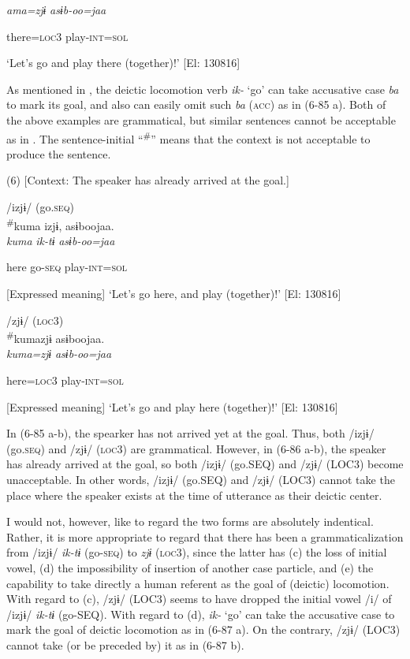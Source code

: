       \textit{ama=zjɨ}  \textit{asɨb-oo=jaa}

      there=\textsc{loc}3  play-\textsc{int}=\textsc{sol}

\glt ‘Let’s go and play there (together)!’ [El: 130816]

As mentioned in , the deictic locomotion verb \textit{ik-} ‘go’ can take accusative case \textit{ba} to mark its goal, and also can easily omit such \textit{ba} (\textsc{acc}) as in (6-85 a). Both of the above examples are grammatical, but similar sentences cannot be acceptable as in . The sentence-initial “\textsuperscript{\#}” means that the context is not acceptable to produce the sentence.

(6)  [Context: The speaker has already arrived at the goal.]

 \ea /izjɨ/ (go.\textsc{seq})\\
{\TM}
\gll  \textsuperscript{\#}kuma  izjɨ,  asɨboojaa.\\

      \textit{kuma}  \textit{ik-tɨ}  \textit{asɨb-oo=jaa}

      here  go-\textsc{seq}  play-\textsc{int}=\textsc{sol}

      [Expressed meaning] ‘Let’s go here, and play (together)!’ [El: 130816]

 \ex /zjɨ/ (\textsc{loc}3)\\
{\TM}
\gll  \textsuperscript{\#}kumazjɨ  asɨboojaa.\\

      \textit{kuma=zjɨ}  \textit{asɨb-oo=jaa}

      here=\textsc{loc}3  play-\textsc{int}=\textsc{sol}

      [Expressed meaning] ‘Let’s go and play here (together)!’ [El: 130816]

In (6-85 a-b), the spearker has not arrived yet at the goal. Thus, both /izjɨ/ (go.\textsc{seq}) and /zjɨ/ (\textsc{loc}3) are grammatical. However, in (6-86 a-b), the speaker has already arrived at the goal, so both /izjɨ/ (go.SEQ) and /zjɨ/ (LOC3) become unacceptable. In other words, /izjɨ/ (go.SEQ) and /zjɨ/ (LOC3) cannot take the place where the speaker exists at the time of utterance as their deictic center.

  I would not, however, like to regard the two forms are absolutely indentical. Rather, it is more appropriate to regard that there has been a grammaticalization from /izjɨ/ \textit{ik-tɨ} (go-\textsc{seq}) to \textit{zjɨ} (\textsc{loc}3), since the latter has (c) the loss of initial vowel, (d) the impossibility of insertion of another case particle, and (e) the capability to take directly a human referent as the goal of (deictic) locomotion. With regard to (c), /zjɨ/ (LOC3) seems to have dropped the initial vowel /i/ of /izjɨ/ \textit{ik-tɨ} (go-SEQ). With regard to (d), \textit{ik-} ‘go’ can take the accusative case to mark the goal of deictic locomotion as in (6-87 a). On the contrary, /zjɨ/ (LOC3) cannot take (or be preceded by) it as in (6-87 b).

